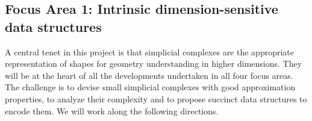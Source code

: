 \subsection*{Focus Area 1:  Intrinsic dimension-sensitive data structures} 

A central tenet in this project is that simplicial complexes are the appropriate representation of shapes for geometry understanding in higher dimensions.  They will be at the heart of all the developments undertaken in all four focus areas.  The challenge is to devise small simplicial complexes with good approximation properties, to analyze their complexity and to propose succinct data structures to encode them. We will work along the following directions.






